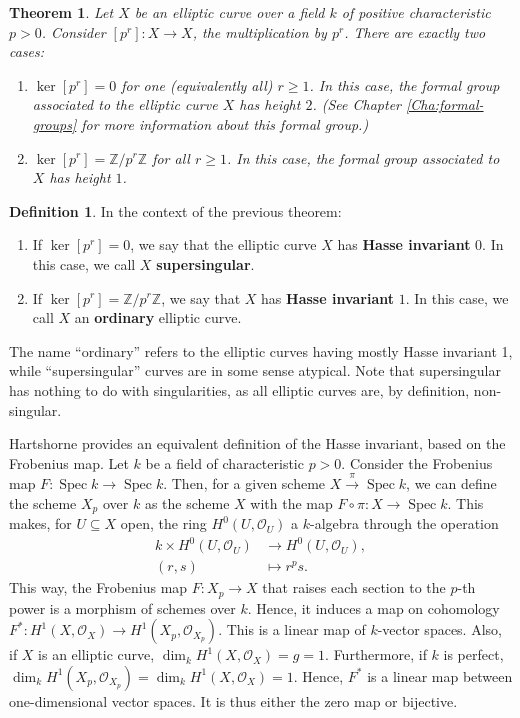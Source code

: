 \documentclass{report}
\DeclareMathOperator{\Spec}{Spec}
\newtheorem{theorem}[equation]{Theorem}
\theoremstyle{definition}
\newtheorem{definition}[equation]{Definition}
\begin{document}
\begin{theorem}
\label{the:supersingular}
Let $X$ be an elliptic curve over a field $k$ of positive characteristic $p>0$. Consider $[p^r]:X\rightarrow X$, the multiplication by $p^r$. There are exactly two cases:
\begin{enumerate}
\item $\ker[p^r]=0$ for one (equivalently all) $r\geq1$. In this case, the formal group associated to the elliptic curve $X$ has height $2$. (See Chapter \ref{Cha:formal-groups} for more information about this formal group.)

\item $\ker[p^r]=\mathbb{Z}/p^r\mathbb{Z}$ for all $r\geq1$. In this case, the formal group associated to $X$ has height $1$.
\end{enumerate}
\end{theorem}

\begin{definition}
In the context of the previous theorem:
\begin{enumerate}
\item If $\ker[p^r]=0$, we say that the elliptic curve $X$ has \textbf{Hasse invariant} $0$. In this case, we call $X$ \textbf{supersingular}.
\item If $\ker[p^r]=\mathbb{Z}/p^r\mathbb{Z}$, we say that $X$ has \textbf{Hasse invariant} $1$. In this case, we call $X$ an \textbf{ordinary} elliptic curve.
\end{enumerate}
\end{definition}

The name ``ordinary'' refers to the elliptic curves having mostly Hasse invariant 1, while ``supersingular'' curves are in some sense atypical. Note that supersingular has nothing to do with singularities, as all elliptic curves are, by definition, non-singular.

Hartshorne \cite[Section~IV.4]{hartshorne1977algebraic} provides an equivalent definition of the Hasse invariant, based on the Frobenius map. Let $k$ be a field of characteristic $p>0$. Consider the Frobenius map $F:\Spec k\rightarrow\Spec k$. Then, for a given scheme $X\xrightarrow{\pi}\Spec k$, we can define the scheme $X_p$ over $k$ as the scheme $X$ with the map $F\circ\pi:X\rightarrow\Spec k$. This makes, for $U\subseteq X$ open, the ring $H^0(U,\mathcal{O}_U)$ a $k$-algebra through the operation
\begin{align*}
k\times H^0(U,\mathcal{O}_U)&\longrightarrow H^0(U,\mathcal{O}_U),\\
(r,s)&\longmapsto r^ps.
\end{align*}
This way, the Frobenius map $F:X_p\rightarrow X$ that raises each section to the $p$-th power is a morphism of schemes over $k$. Hence, it induces a map on cohomology $F^*:H^1(X,\mathcal{O}_X)\rightarrow H^1(X_p,\mathcal{O}_{X_p})$. This is a linear map of $k$-vector spaces. Also, if $X$ is an elliptic curve, $\dim_kH^1(X,\mathcal{O}_X)=g=1$. Furthermore, if $k$ is perfect, $\dim_kH^1(X_p,\mathcal{O}_{X_p})=\dim_kH^1(X,\mathcal{O}_X)=1$. Hence, $F^*$ is a linear map between one-dimensional vector spaces. It is thus either the zero map or bijective.
\end{document}
